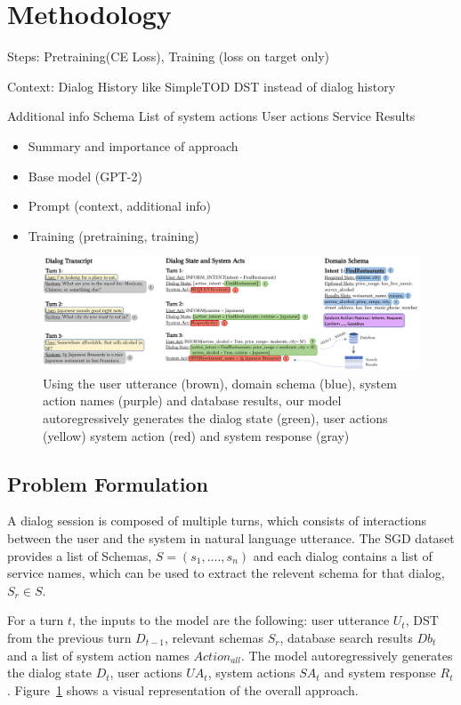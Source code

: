 \section{Methodology}

Steps: Pretraining(CE Loss), Training (loss on target only)

Context:
Dialog History like SimpleTOD
DST instead of dialog history

Additional info
Schema
List of system actions
User actions
Service Results

\begin{itemize}
    \item Summary and importance of approach
    \item Base model (GPT-2)
    \item Prompt (context, additional info)
    \item Training (pretraining, training)
\end{itemize}

\begin{figure}
    \centering
    \includegraphics[width=\linewidth]{assets/approach.png}
    \caption{
        Using the user utterance (brown), domain schema (blue), system action names (purple) and database results, our model autoregressively generates the dialog state (green),
        user actions (yellow) system action (red) and system response (gray)
    }
    \label{fig:approach}
\end{figure}

\subsection{Problem Formulation}

A dialog session is composed of multiple turns, which consists of interactions between the user and the system
in natural language utterance.
The SGD dataset provides a list of Schemas, $S = (s_1, ...., s_n)$ and each dialog contains a list of service names, which
can be used to extract the relevent schema for that dialog, $S_r \in S$.

For a turn $t$, the inputs to the model are the following: user utterance $U_t$, DST from the previous turn $D_{t-1}$, relevant schemas $S_r$, database search results $Db_t$
and a list of system action names $Action_{all}$.
The model autoregressively generates the dialog state $D_{t}$, user actions $UA_t$, system actions $SA_t$ and system response $R_t$.
Figure~\ref{fig:approach} shows a visual representation of the overall approach.


